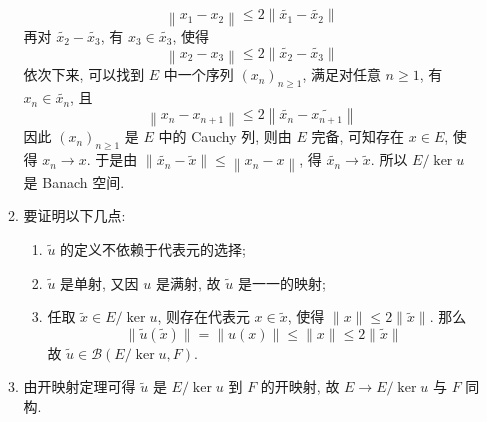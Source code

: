 \begin{enumerate}
\begin{enumerate}
            \[
                \left\|x_{1}-x_{2}\right\| \leq 2\left\|\widetilde{x_{1}}-\widetilde{x_{2}}\right\|
            \]
            再对 $\widetilde{x_{2}}-\widetilde{x_{3}}$, 有 $x_{3} \in \widetilde{x_{3}}$, 使得
            \[
                \left\|x_{2}-x_{3}\right\| \leq 2\left\|\widetilde{x_{2}}-\widetilde{x_{3}}\right\|
            \]
            依次下来, 可以找到 $E$ 中一个序列 $\left(x_{n}\right)_{n \geq 1}$, 满足对任意 $n \geq 1$, 有 $x_{n} \in \widetilde{x_{n}}$, 且
            \[
                \left\|x_{n}-x_{n+1}\right\| \leq 2\left\|\widetilde{x_{n}}-\widetilde{x_{n+1}}\right\|
            \]
            因此 $\left(x_{n}\right)_{n \geq 1}$ 是 $E$ 中的 Cauchy 列, 则由 $E$ 完备, 可知存在 $x \in E$, 使得 $x_{n} \rightarrow x$. 于是由 $\left\|\widetilde{x_{n}}-\widetilde{x}\right\| \leq\left\|x_{n}-x\right\|$, 得 $\widetilde{x_{n}} \rightarrow \widetilde{x}$. 所以 $E / \operatorname{ker} u$ 是 Banach 空间.
            \item 要证明以下几点:
                \begin{enumerate}
                    \item $\widetilde{u}$ 的定义不依赖于代表元的选择;
                    \item $\widetilde{u}$ 是单射, 又因 $u$ 是满射, 故 $\widetilde{u}$ 是一一的映射;
                    \item 任取 $\widetilde{x} \in E / \operatorname{ker} u$, 则存在代表元 $x \in \widetilde{x}$, 使得 $\|x\| \leq 2\|\widetilde{x}\| .$ 那么
                    \[
                    \|\widetilde{u}(\widetilde{x})\|=\|u(x)\| \leq\|x\| \leq 2\|\widetilde{x}\|
                    \]
                    故 $\widetilde{u} \in \mathcal{B}(E / \operatorname{ker} u, F)$.
                \end{enumerate}
            \item 由开映射定理可得 $\widetilde{u}$ 是 $E / \operatorname{ker} u$ 到 $F$ 的开映射, 故 $E \rightarrow E / \operatorname{ker} u$ 与 $F$ 同构.
        \end{enumerate}
\end{enumerate}
